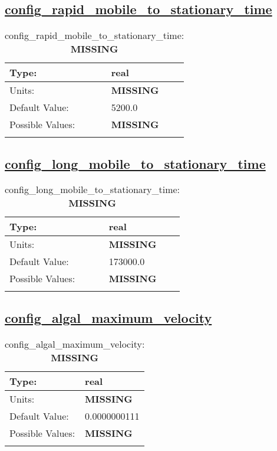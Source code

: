 \subsection[config\_rapid\_mobile\_to\_stationary\_time]{\hyperref[sec:nm_tab_biogeochemistry]{config\_rapid\_mobile\_to\_stationary\_time}}
\label{subsec:nm_sec_config_rapid_mobile_to_stationary_time}
\begin{center}
\begin{longtable}{| p{2.0in} || p{4.0in} |}
    \hline
    Type: & real \\
    \hline
    Units: & {\bf \color{red} MISSING} \\
    \hline
    Default Value: & 5200.0 \\
    \hline
    Possible Values: & {\bf \color{red} MISSING} \\
    \hline
    \caption{config\_rapid\_mobile\_to\_stationary\_time: {\bf \color{red} MISSING}}
\end{longtable}
\end{center}
\subsection[config\_long\_mobile\_to\_stationary\_time]{\hyperref[sec:nm_tab_biogeochemistry]{config\_long\_mobile\_to\_stationary\_time}}
\label{subsec:nm_sec_config_long_mobile_to_stationary_time}
\begin{center}
\begin{longtable}{| p{2.0in} || p{4.0in} |}
    \hline
    Type: & real \\
    \hline
    Units: & {\bf \color{red} MISSING} \\
    \hline
    Default Value: & 173000.0 \\
    \hline
    Possible Values: & {\bf \color{red} MISSING} \\
    \hline
    \caption{config\_long\_mobile\_to\_stationary\_time: {\bf \color{red} MISSING}}
\end{longtable}
\end{center}
\subsection[config\_algal\_maximum\_velocity]{\hyperref[sec:nm_tab_biogeochemistry]{config\_algal\_maximum\_velocity}}
\label{subsec:nm_sec_config_algal_maximum_velocity}
\begin{center}
\begin{longtable}{| p{2.0in} || p{4.0in} |}
    \hline
    Type: & real \\
    \hline
    Units: & {\bf \color{red} MISSING} \\
    \hline
    Default Value: & 0.0000000111 \\
    \hline
    Possible Values: & {\bf \color{red} MISSING} \\
    \hline
    \caption{config\_algal\_maximum\_velocity: {\bf \color{red} MISSING}}
\end{longtable}
\end{center}
